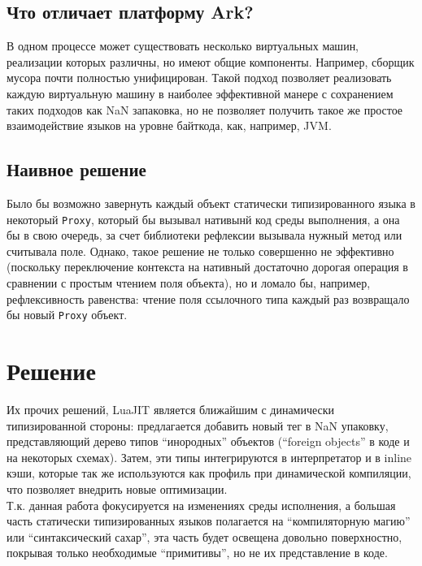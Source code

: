 \documentclass[times,specification,annotation]{itmo-student-thesis}
\begin{document}
\finishrelatedwork

\section{Что отличает платформу Ark?}
В одном процессе может существовать несколько виртуальных машин, реализации которых различны, но имеют общие компоненты. Например, сборщик мусора почти полностью унифицирован. Такой подход позволяет реализовать каждую виртуальную машину в наиболее эффективной манере с сохранением таких подходов как NaN запаковка, но не позволяет получить такое же простое взаимодействие языков на уровне байткода, как, например, JVM.

\section{Наивное решение}
Было бы возможно завернуть каждый объект статически типизированного языка в некоторый \texttt{Proxy}, который бы вызывал нативынй код среды выполнения, а она бы в свою очередь, за счет библиотеки рефлексии вызывала нужный метод или считывала поле. Однако, такое решение не только совершенно не эффективно (поскольку переключение контекста на нативный достаточно дорогая операция в сравнении с простым чтением поля объекта), но и ломало бы, например, рефлексивность равенства: чтение поля ссылочного типа каждый раз возвращало бы новый \texttt{Proxy} объект.

\chapter{Решение}
Их прочих решений, LuaJIT является ближайшим с динамически типизированной стороны: предлагается добавить новый тег в NaN упаковку, представляющий дерево типов ``инородных'' объектов (``foreign objects'' в коде и на некоторых схемах). Затем, эти типы интегрируются в интерпретатор и в inline кэши, которые так же используются как профиль при динамической компиляции, что позволяет внедрить новые оптимизации.\\
Т.к. данная работа фокусируется на изменениях среды исполнения, а большая часть статически типизированных языков полагается на ``компиляторную магию'' или ``синтаксический сахар'', эта часть будет освещена довольно поверхностно, покрывая только необходимые ``примитивы'', но не их представление в коде.
\end{document}

